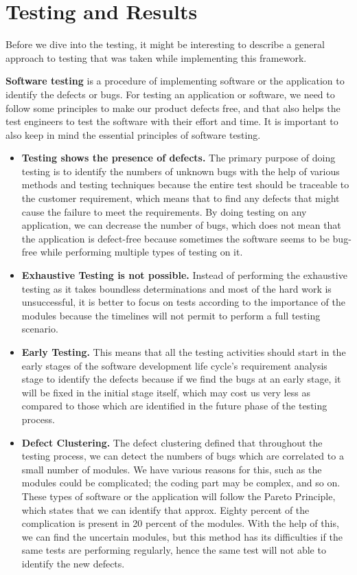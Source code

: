 \documentclass[thesis=M,english,hidelinks]{FITthesis}[2019/12/23]
\begin{document}
\chapter{Testing and Results}

Before we dive into the testing, it might be interesting to describe a general approach to testing that was taken while implementing this framework.

\textbf{Software testing} is a procedure of implementing software or the application to identify the defects or bugs. For testing an application or software, we need to follow some principles to make our product defects free, and that also helps the test engineers to test the software with their effort and time. It is important to also keep in mind the essential principles of software testing.

\begin{itemize}
	\item \textbf{Testing shows the presence of defects.} The primary purpose of doing testing is to identify the numbers of unknown bugs with the help of various methods and testing techniques because the entire test should be traceable to the customer requirement, which means that to find any defects that might cause the failure to meet the requirements. By doing testing on any application, we can decrease the number of bugs, which does not mean that the application is defect-free because sometimes the software seems to be bug-free while performing multiple types of testing on it.
	\item \textbf{Exhaustive Testing is not possible.} Instead of performing the exhaustive testing as it takes boundless determinations and most of the hard work is unsuccessful, it is better to focus on tests  according to the importance of the modules because the timelines will not permit to perform a full testing scenario.
	\item \textbf{Early Testing.} This means that all the testing activities should start in the early stages of the software development life cycle's requirement analysis stage to identify the defects because if we find the bugs at an early stage, it will be fixed in the initial stage itself, which may cost us very less as compared to those which are identified in the future phase of the testing process.
	\item \textbf{Defect Clustering.} The defect clustering defined that throughout the testing process, we can detect the numbers of bugs which are correlated to a small number of modules. We have various reasons for this, such as the modules could be complicated; the coding part may be complex, and so on. These types of software or the application will follow the Pareto Principle, which states that we can identify that approx. Eighty percent of the complication is present in 20 percent of the modules. With the help of this, we can find the uncertain modules, but this method has its difficulties if the same tests are performing regularly, hence the same test will not able to identify the new defects.

\end{itemize}
\end{document}
